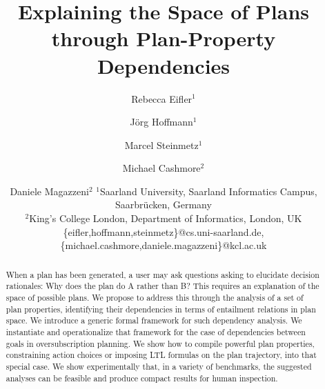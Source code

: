 \documentclass{article}
\begin{document}
\title{Explaining the Space of Plans through Plan-Property Dependencies}

\author{
Rebecca Eifler$^1$\and
J\"org Hoffmann$^1$\and
Marcel Steinmetz$^1$\and
Michael Cashmore$^2$\and
Daniele Magazzeni$^2$
\affiliations
$^1$Saarland University, Saarland Informatics Campus, Saarbr\"ucken, Germany\\
$^2$King's College London, Department of Informatics, London, UK\\
\emails
\{eifler,hoffmann,steinmetz\}@cs.uni-saarland.de,
\{michael.cashmore,daniele.magazzeni\}@kcl.ac.uk 
}
%

\maketitle

\begin{abstract}
When a plan has been generated, a user may ask questions asking to
elucidate decision rationales: Why does the plan do A rather than B?
This requires an explanation of the space of possible plans. We
propose to address this through the analysis of a set of plan
properties, identifying their dependencies in terms of entailment
relations in plan space. We introduce a generic formal framework for
such dependency analysis. We instantiate and operationalize that
framework for the case of dependencies between goals in
oversubscription planning.
%
%
%
We show how to compile powerful plan properties, constraining action
choices or imposing LTL formulas on the plan trajectory, into that
special case.
%
We show experimentally that, in a variety of benchmarks, the suggested
analyses can be feasible and produce compact results for human
inspection.
\end{abstract}
\end{document}

